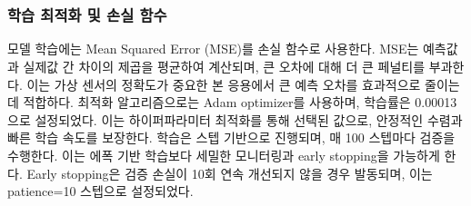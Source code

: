 \documentclass[final,5p,times,twocolumn,authoryear]{elsarticle}
\begin{document}
\begin{table}[t]
    \centering
    \renewcommand{\arraystretch}{1.0} 
    
    \caption{Selected Hyperparameters}
    \label{tab:hyperparams}
\end{table}

\subsubsection{학습 최적화 및 손실 함수}
모델 학습에는 Mean Squared Error (MSE)를 손실 함수로 사용한다. MSE는 예측값과 실제값 간 차이의 제곱을 평균하여 계산되며, 큰 오차에 대해 더 큰 페널티를 부과한다. 이는 가상 센서의 정확도가 중요한 본 응용에서 큰 예측 오차를 효과적으로 줄이는 데 적합하다.
최적화 알고리즘으로는 Adam optimizer를 사용하며, 학습률은 0.00013으로 설정되었다. 이는 하이퍼파라미터 최적화를 통해 선택된 값으로, 안정적인 수렴과 빠른 학습 속도를 보장한다.
학습은 스텝 기반으로 진행되며, 매 100 스텝마다 검증을 수행한다. 이는 에폭 기반 학습보다 세밀한 모니터링과 early stopping을 가능하게 한다. Early stopping은 검증 손실이 10회 연속 개선되지 않을 경우 발동되며, 이는 patience=10 스텝으로 설정되었다.
\end{document}
